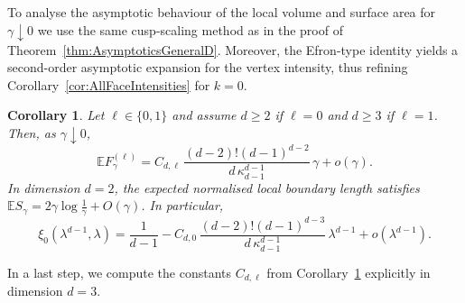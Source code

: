 \documentclass[11pt,a4paper]{article}
\theoremstyle{plain}
\newtheorem{corollary}[theorem]{Corollary}
\theoremstyle{definition}
\theoremstyle{remark}
\def\EE{\mathbb{E}}
\begin{document}
To analyse the asymptotic behaviour of the local volume and surface area for $\gamma\downarrow 0$
we use the same
cusp-scaling method as in the proof of
Theorem~\ref{thm:AsymptoticsGeneralD}. Moreover, the Efron-type identity
yields a second-order asymptotic expansion for the vertex intensity, thus
refining Corollary~\ref{cor:AllFaceIntensities} for $k=0$.

\begin{corollary}\label{cor:LocalVolumeAsymptotics}
	Let $\ell\in\{0,1\}$ and assume $d\geq 2$ if $\ell=0$ and $d\geq 3$ if $\ell=1$. Then, as $\gamma\downarrow0$,
	\[
		\EE F^{(\ell)}_{\gamma}
		=
		C_{d,\ell}\,
		\frac{(d-2)!(d-1)^{d-2}}{d\,\kappa_{d-1}^{d-1}}\,
		\gamma
		+
		o(\gamma).
	\]
	In dimension $d=2$, the expected normalised local boundary length satisfies $\EE S_{\gamma}=2\gamma\log\frac{1}{\gamma}+O(\gamma)$.
	In particular,
	\[
		\xi_0(\lambda^{d-1},\lambda)
		=
		\frac{1}{d-1}
		-
		C_{d,0}\,
		\frac{(d-2)!(d-1)^{d-3}}{d\,\kappa_{d-1}^{d-1}}\,
		\lambda^{d-1}
		+
		o(\lambda^{d-1}).
	\]
\end{corollary}


In a last step, we compute the constants $C_{d,\ell}$ from
Corollary~\ref{cor:LocalVolumeAsymptotics} explicitly in dimension $d=3$.
\end{document}
